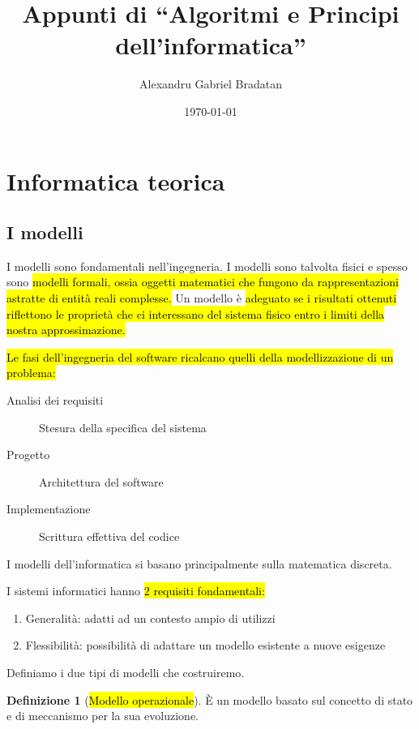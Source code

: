 \documentclass[a4paper,11pt,oneside]{article}
\title{Appunti di ``Algoritmi e Principi dell'informatica''}
\author{Alexandru Gabriel Bradatan}
\date{\today}
\theoremstyle{plain}
\theoremstyle{definition}
\newtheorem{defn}{Definizione}[section]
\theoremstyle{remark}
\begin{document}
\maketitle
\tableofcontents
\newpage

\section{Informatica teorica}

\subsection{I modelli}\label{sec:modelli}

I modelli sono fondamentali nell'ingegneria. I modelli sono talvolta fisici e
spesso sono \hl{modelli formali, ossia oggetti matematici che fungono da
rappresentazioni astratte di entità reali complesse.} Un modello è \hl{adeguato
se i risultati ottenuti riflettono le proprietà che ci interessano del sistema
fisico entro i limiti della nostra approssimazione.}

\hl{Le fasi dell'ingegneria del software ricalcano quelli della modellizzazione
di un problema:}

\begin{description}
  \item[Analisi dei requisiti] Stesura della specifica del sistema
  \item[Progetto] Architettura del software
  \item[Implementazione] Scrittura effettiva del codice
\end{description}

I modelli dell'informatica si basano principalmente sulla matematica discreta.

I sistemi informatici hanno \hl{2 requisiti fondamentali:}

\begin{enumerate}
  \item Generalità: adatti ad un contesto ampio di utilizzi
  \item Flessibilità: possibilità di adattare un modello esistente a nuove
    esigenze
\end{enumerate}

Definiamo i due tipi di modelli che costruiremo.

\begin{defn}[\hl{Modello operazionale}]\label{def:modello-op}
  È un modello basato sul concetto di stato e di meccanismo per la sua
  evoluzione.
\end{defn}
\end{document}
